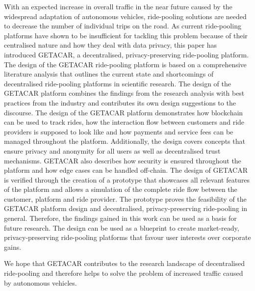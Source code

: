 With an expected increase in overall traffic in the near future caused by the widespread adaptation of autonomous vehicles, ride-pooling solutions are needed to decrease the number of individual trips on the road. As current ride-pooling platforms have shown to be insufficient for tackling this problem because of their centralised nature and how they deal with data privacy, this paper has introduced GETACAR, a decentralised, privacy-preserving ride-pooling platform. The design of the GETACAR ride-pooling platform is based on a comprehensive literature analysis that outlines the current state and shortcomings of decentralised ride-pooling platforms in scientific research. The design of the GETACAR platform combines the findings from the research analysis with best practices from the industry and contributes its own design suggestions to the discourse. The design of the GETACAR platform demonstrates how blockchain can be used to track rides,  how the interaction flow between customers and ride providers is supposed to look like and how payments and service fees can be managed throughout the platform. Additionally, the design covers concepts that ensure privacy and anonymity for all users as well as decentralised trust mechanisms. GETACAR also describes how security is ensured throughout the platform and how edge cases can be handled off-chain. 
The design of GETACAR is verified through the creation of a prototype that showcases all relevant features of the platform and allows a simulation of the complete ride flow between the customer, platform and ride provider. The prototype proves the feasibility of the GETACAR platform design and decentralised, privacy-preserving ride-pooling in general. Therefore, the findings gained in this work can be used as a basis for future research. The design can be used as a blueprint to create market-ready,  privacy-preserving ride-pooling platforms that favour user interests over corporate gains. 

We hope that GETACAR contributes to the research landscape of decentralised ride-pooling and therefore helps to solve the problem of increased traffic caused by autonomous vehicles.